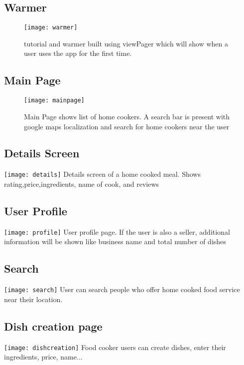 \documentclass{article}
\begin{document}
  \subsection{Warmer}
    \begin{figure}
    \centering
    \texttt{[image: warmer]}
    \caption{tutorial and warmer built using viewPager which will show when a user uses the app for the first time. }
    \label{fig:warmer}
    \end{figure}

  \subsection{Main Page}
    \begin{figure}
    \centering
    \texttt{[image: mainpage]}
    \caption{Main Page shows list of home cookers. A search bar is present with google maps localization and search for home cookers near the user }
    \label{fig:warmer}
    \end{figure}

    





  \subsection{Details Screen}
    \texttt{[image: details]} 
    Details screen of a home cooked meal. Shows rating,price,ingredients, name of cook, and reviews

  \subsection{User Profile}
    \texttt{[image: profile]}
    User profile page. If the user is also a seller, additional information will be shown like business name and total number of dishes

  \subsection{Search}
    \texttt{[image: search]}
    User can search people who offer home cooked food service near their location.

  \subsection{Dish creation page}
    \texttt{[image: dishcreation]}
    Food cooker users can create dishes, enter their ingredients, price, name...
\end{document}
